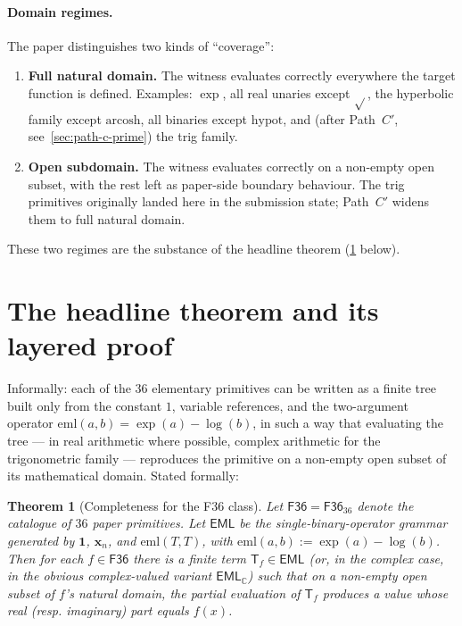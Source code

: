 \documentclass[11pt,a4paper]{article}
\newcommand{\F}{\mathsf{F36}}
\newcommand{\EML}{\mathsf{EML}}
\newcommand{\Eset}{\EML}
\theoremstyle{plain}
\newtheorem{theorem}{Theorem}
\theoremstyle{definition}
\begin{document}
\paragraph{Domain regimes.} The paper distinguishes two kinds of
``coverage'':
\begin{enumerate}[topsep=2pt, itemsep=2pt]
  \item \textbf{Full natural domain.} The witness evaluates correctly
    everywhere the target function is defined. Examples:
    $\exp$, all real unaries except $\sqrt{}$, the hyperbolic family
    except $\mathrm{arcosh}$, all binaries except $\mathrm{hypot}$,
    and (after Path~$C'$, see~\cref{sec:path-c-prime}) the trig family.
  \item \textbf{Open subdomain.} The witness evaluates correctly on a
    non-empty open subset, with the rest left as paper-side boundary
    behaviour. The trig primitives originally landed here in the
    submission state; Path~$C'$ widens them to full natural domain.
\end{enumerate}
These two regimes are the substance of the headline theorem
(\cref{thm:headline} below).

\section{The headline theorem and its layered proof}
\label{sec:headline-theorem}

Informally: each of the $36$ elementary primitives can be written
as a finite tree built only from the constant $1$, variable
references, and the two-argument operator
$\mathrm{eml}(a, b) = \exp(a) - \log(b)$, in such a way that
evaluating the tree --- in real arithmetic where possible, complex
arithmetic for the trigonometric family --- reproduces the primitive
on a non-empty open subset of its mathematical domain. Stated
formally:

\begin{theorem}[Completeness for the F36 class]
\label{thm:headline}
Let $\F = \F_{36}$ denote the catalogue of $36$ paper primitives.
Let $\Eset$ be the single-binary-operator grammar generated by
$\mathbf{1}$, $\mathbf{x}_n$, and $\mathrm{eml}(T, T)$, with
$\mathrm{eml}(a, b) := \exp(a) - \log(b)$. Then for each $f \in \F$
there is a finite term $\mathsf{T}_f \in \Eset$ (or, in the complex
case, in the obvious complex-valued variant $\Eset_{\mathbb{C}}$) such
that on a non-empty open subset of $f$'s natural domain, the partial
evaluation of $\mathsf{T}_f$ produces a value whose real (resp.
imaginary) part equals $f(x)$.
\end{theorem}
\end{document}
